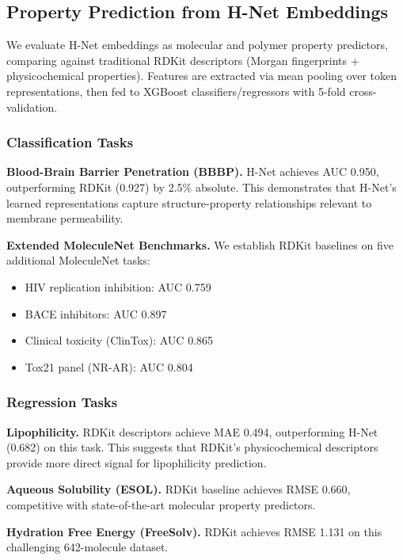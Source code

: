 
\subsection{Property Prediction from H-Net Embeddings}

We evaluate H-Net embeddings as molecular and polymer property predictors, comparing against traditional RDKit descriptors (Morgan fingerprints + physicochemical properties). Features are extracted via mean pooling over token representations, then fed to XGBoost classifiers/regressors with 5-fold cross-validation.

\subsubsection{Classification Tasks}

\textbf{Blood-Brain Barrier Penetration (BBBP).} H-Net achieves AUC 0.950, outperforming RDKit (0.927) by 2.5\% absolute. This demonstrates that H-Net's learned representations capture structure-property relationships relevant to membrane permeability.

\textbf{Extended MoleculeNet Benchmarks.} We establish RDKit baselines on five additional MoleculeNet tasks:
\begin{itemize}
    \item HIV replication inhibition: AUC 0.759
    \item BACE inhibitors: AUC 0.897
    \item Clinical toxicity (ClinTox): AUC 0.865
    \item Tox21 panel (NR-AR): AUC 0.804
\end{itemize}

\subsubsection{Regression Tasks}

\textbf{Lipophilicity.} RDKit descriptors achieve MAE 0.494, outperforming H-Net (0.682) on this task. This suggests that RDKit's physicochemical descriptors provide more direct signal for lipophilicity prediction.

\textbf{Aqueous Solubility (ESOL).} RDKit baseline achieves RMSE 0.660, competitive with state-of-the-art molecular property predictors.

\textbf{Hydration Free Energy (FreeSolv).} RDKit achieves RMSE 1.131 on this challenging 642-molecule dataset.

